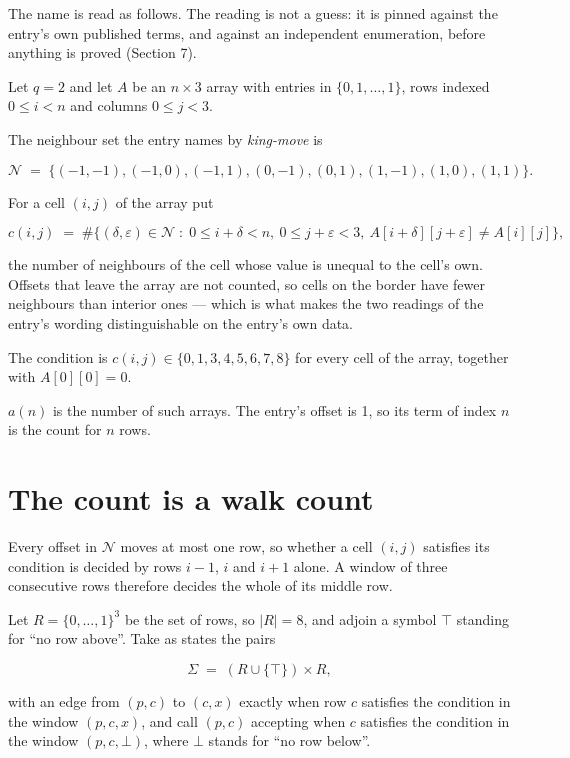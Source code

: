\documentclass[11pt]{article}
\theoremstyle{definition}
\begin{document}
The name is read as follows. The reading is not a guess: it is pinned against the entry's own published terms, and against an independent enumeration, before anything is proved (Section 7).

Let $q = 2$ and let $A$ be an $n \times 3$ array with entries in $\{0,1,\dots,1\}$, rows indexed $0 \le i < n$ and columns $0 \le j < 3$.

The neighbour set the entry names by {\itshape king-move} is

\[\mathcal{N} \;=\; \{(-1,-1), (-1,0), (-1,1), (0,-1), (0,1), (1,-1), (1,0), (1,1)\}.\]

For a cell $(i,j)$ of the array put

\[c(i,j) \;=\; \#\bigl\{(\delta,\varepsilon)\in\mathcal{N} \;:\; 0\le i+\delta<n,\ 0\le j+\varepsilon<3,\ A[i+\delta][j+\varepsilon] \neq A[i][j]\bigr\},\]

the number of neighbours of the cell whose value is unequal to the cell's own. Offsets that leave the array are not counted, so cells on the border have fewer neighbours than interior ones --- which is what makes the two readings of the entry's wording distinguishable on the entry's own data.

The condition is $c(i,j) \in \{0, 1, 3, 4, 5, 6, 7, 8\}$ for every cell of the array, together with $A[0][0]=0$.

$a(n)$ is the number of such arrays. The entry's offset is 1, so its term of index $n$ is the count for $n$ rows.

\section{The count is a walk count}

Every offset in $\mathcal{N}$ moves at most one row, so whether a cell $(i,j)$ satisfies its condition is decided by rows $i-1$, $i$ and $i+1$ alone. A window of three consecutive rows therefore decides the whole of its middle row.

Let $R = \{0,\dots,1\}^{3}$ be the set of rows, so $|R| = 8$, and adjoin a symbol $\top$ standing for ``no row above''. Take as states the pairs

\[\Sigma \;=\; (R \cup \{\top\}) \times R,\]

with an edge from $(p,c)$ to $(c,x)$ exactly when row $c$ satisfies the condition in the window $(p,c,x)$, and call $(p,c)$ accepting when $c$ satisfies the condition in the window $(p,c,\bot)$, where $\bot$ stands for ``no row below''.
\end{document}
